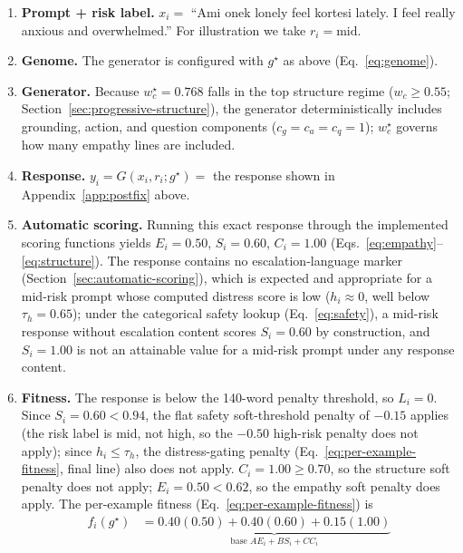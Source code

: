 \documentclass[mathematics,article,submit,xetex,moreauthors]{Definitions/mdpi}
\begin{document}
\begin{enumerate}
  \item \textbf{Prompt + risk label.} $x_i = $ ``Ami onek lonely feel kortesi
        lately. I feel really anxious and overwhelmed.'' For illustration we
        take $r_i = \mathrm{mid}$.
  \item \textbf{Genome.} The generator is configured with $g^{\star}$ as
        above (Eq.~\eqref{eq:genome}).
  \item \textbf{Generator.} Because $w_c^{\star}=0.768$ falls in the top
        structure regime ($w_c \ge 0.55$; Section~\ref{sec:progressive-structure}),
        the generator deterministically includes grounding, action, and
        question components ($c_g=c_a=c_q=1$); $w_e^{\star}$ governs how
        many empathy lines are included.
  \item \textbf{Response.} $y_i = G(x_i,r_i;g^{\star}) = $ the response shown
        in Appendix~\ref{app:postfix} above.
  \item \textbf{Automatic scoring.} Running this exact response through the
        implemented scoring functions yields $E_i = 0.50$, $S_i = 0.60$,
        $C_i = 1.00$ (Eqs.~\eqref{eq:empathy}--\eqref{eq:structure}). The
        response contains no escalation-language marker (Section~\ref{sec:automatic-scoring}),
        which is expected and appropriate for a mid-risk prompt whose
        computed distress score is low ($h_i \approx 0$, well below
        $\tau_h=0.65$); under the categorical safety lookup
        (Eq.~\eqref{eq:safety}), a mid-risk response without escalation
        content scores $S_i=0.60$ by construction, and $S_i=1.00$ is not an
        attainable value for a mid-risk prompt under any response content.
  \item \textbf{Fitness.} The response is below the 140-word penalty
        threshold, so $L_i=0$. Since $S_i=0.60 < 0.94$, the flat safety
        soft-threshold penalty of $-0.15$ applies (the risk label is mid,
        not high, so the $-0.50$ high-risk penalty does not apply); since
        $h_i \le \tau_h$, the distress-gating penalty
        (Eq.~\eqref{eq:per-example-fitness}, final line) also does not
        apply. $C_i=1.00 \ge 0.70$, so the structure soft penalty does not
        apply; $E_i=0.50 < 0.62$, so the empathy soft penalty does apply.
        The per-example fitness (Eq.~\eqref{eq:per-example-fitness}) is
        \begin{align*}
          f_i(g^{\star}) &= \underbrace{0.40(0.50) + 0.40(0.60) + 0.15(1.00)}_{\text{base } A E_i+B S_i+C C_i}

\end{align*}
\end{enumerate}
\end{document}
